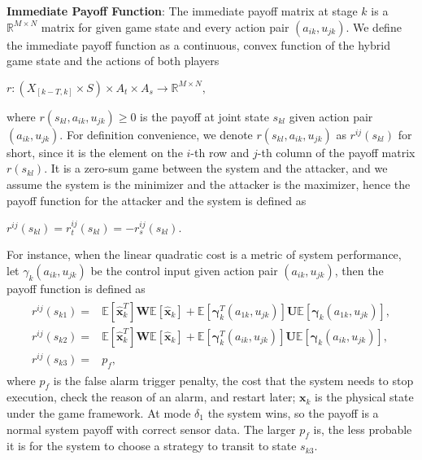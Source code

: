 \textbf{Immediate Payoff Function}: The immediate payoff matrix at stage $k$ is a $\mathbb{R}^{M\times N}$ matrix for given game state and every action pair $(a_{ik}, u_{jk})$. We define the immediate payoff function as a continuous, convex function of the hybrid game state and the actions of both players
\\\centerline{$r: (X_{[k-T,k]}\times S) \times A_{t} \times A_{s} \to \mathbb{R}^{M \times N},$}
where $r(s_{kl}, a_{ik}, u_{jk}) \geqslant 0$ is the payoff at joint state $s_{kl}$ given action pair $(a_{ik}, u_{jk})$. For definition convenience, we denote ${r}(s_{kl}, a_{ik}, u_{jk})$ as ${r}^{ij}(s_{kl})$ for short, since it is the element on the $i$-th row and $j$-th column of the payoff matrix ${r}(s_{kl})$. It is a zero-sum game between the system and the attacker, and we assume the system is the minimizer and the attacker is the maximizer, hence the payoff function for the attacker and the system is defined as
\centerline{$
{r}^{ij}(s_{kl})={r}_t^{ij}(s_{kl})=-{r}_s^{ij}(s_{kl}).
$}
For instance, when the linear quadratic cost is a metric of system performance, let $\gamma_{k}(a_{ik}, u_{jk})$ be the control input given action pair $(a_{ik}, u_{jk})$, then the payoff function is defined as
\begin{align}
\begin{split}
{r}^{ij} (s_{k1}) =&\mathbb{E}[\mathbf{\hat{x}}^{T}_{k}]\mathbf{W}\mathbb{E}[\mathbf{\hat{x}}_{k}]+\mathbb{E}[\mathbf{\gamma}^{T}_{k}(a_{1k},u_{jk})]\mathbf{U}\mathbb{E}[\mathbf{\gamma}_{k}(a_{1k},u_{jk})],\\
{r}^{ij} (s_{k2}) =&\mathbb{E}[\mathbf{\hat{x}}^{T}_{k}]\mathbf{W}\mathbb{E}[\mathbf{\hat{x}}_{k}]+\mathbb{E}[\mathbf{\gamma}^{T}_{k}(a_{ik},u_{jk})]\mathbf{U}\mathbb{E}[\mathbf{\gamma}_{k}(a_{ik}, u_{jk})],\\
{r}^{ij} (s_{k3}) =& p_f,
\end{split}
\label{payoff}
\end{align}
where $p_f$ is the false alarm trigger penalty, the cost that the system needs to stop execution, check the reason of an alarm, and restart later; $\mathbf{x}_{k}$ is the physical state under the game framework. At mode $\delta_{1}$ the system wins, so the payoff is a normal system payoff with correct sensor data. The larger $p_f$ is, the less probable it is for the system to choose a strategy to transit to state $s_{k3}$.

